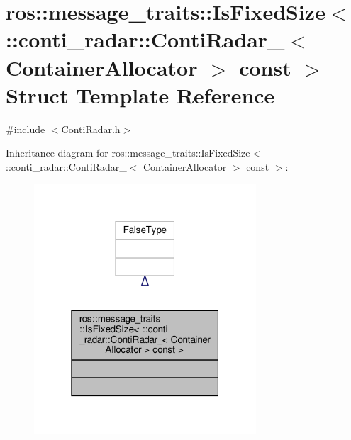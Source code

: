 \hypertarget{structros_1_1message__traits_1_1IsFixedSize_3_01_1_1conti__radar_1_1ContiRadar___3_01ContainerAllocator_01_4_01const_01_4}{}\section{ros\+:\+:message\+\_\+traits\+:\+:Is\+Fixed\+Size$<$ \+:\+:conti\+\_\+radar\+:\+:Conti\+Radar\+\_\+$<$ Container\+Allocator $>$ const $>$ Struct Template Reference}
\label{structros_1_1message__traits_1_1IsFixedSize_3_01_1_1conti__radar_1_1ContiRadar___3_01ContainerAllocator_01_4_01const_01_4}


{\ttfamily \#include $<$Conti\+Radar.\+h$>$}



Inheritance diagram for ros\+:\+:message\+\_\+traits\+:\+:Is\+Fixed\+Size$<$ \+:\+:conti\+\_\+radar\+:\+:Conti\+Radar\+\_\+$<$ Container\+Allocator $>$ const $>$\+:\nopagebreak
\begin{figure}[H]
\begin{center}
\leavevmode
\includegraphics[width=235pt]{df/de3/structros_1_1message__traits_1_1IsFixedSize_3_01_1_1conti__radar_1_1ContiRadar___3_01ContainerAlec74de0288b0fed31da8d8ff2fd409fa}
\end{center}
\end{figure}


